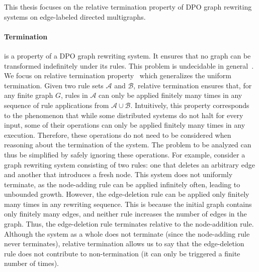 
    This thesis focuses on the relative termination property of DPO graph rewriting systems on edge-labeled directed multigraphs.

\paragraph{Termination} is a property of a DPO graph rewriting system. It ensures that no graph can be transformed indefinitely under its rules. This problem is undecidable in general~\cite{plump1998terminationundecidable}.
We focus on relative termination property~\cite{klop1987term,geser1990relative} which generalizes the uniform termination.
 Given two rule sets \( \mathcal{A} \) and \( \mathcal{B} \), relative termination ensures that, for any finite graph $G$,
rules in $\mathcal{A}$ can only be applied finitely many times in any sequence of rule applications from $\mathcal{A} \cup \mathcal{B}$. Intuitively, this property corresponds to the phenomenon that while some distributed systems do not halt for every input, some of their operations can only be applied finitely many times in any execution. 
Therefore, these operations do not need to be considered when reasoning about the termination of the system. The problem to be analyzed can thus be simplified by safely ignoring these operations.
For example, consider a graph rewriting system consisting of two rules: one that deletes an arbitrary edge and another that introduces a fresh node. This system does not uniformly terminate, as the node-adding rule can be applied infinitely often, leading to unbounded growth. However, the edge-deletion rule can be applied only finitely many times in any rewriting sequence. This is because the initial graph contains only finitely many edges, and neither rule increases the number of edges in the graph. Thus, the edge-deletion rule terminates relative to the node-addition rule.
Although the system as a whole does not terminate (since the node-adding rule never terminates), relative termination allows us to say that the edge-deletion rule does not contribute to non-termination (it can only be triggered a finite number of times).


